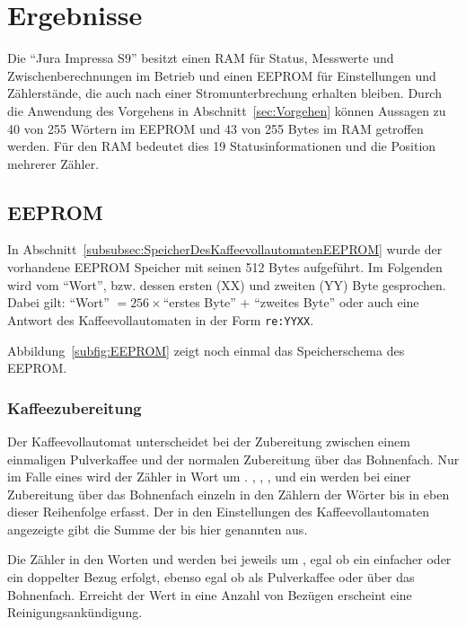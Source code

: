 \chapter{Ergebnisse}\label{ch:Ergebnisse} %
Die "`Jura Impressa S9"' besitzt einen \ac{RAM} für Status, Messwerte und Zwischenberechnungen im Betrieb und einen \ac{EEPROM} für Einstellungen und Zählerstände, die auch nach einer Stromunterbrechung erhalten bleiben.
Durch die Anwendung des Vorgehens in Abschnitt~\ref{sec:Vorgehen} können Aussagen zu 40 von 255 Wörtern im \ac{EEPROM} und 43 von 255 Bytes im \ac{RAM} getroffen werden.
Für den \ac{RAM} bedeutet dies 19 Statusinformationen und die Position mehrerer Zähler.

\section{EEPROM}
In Abschnitt~\ref{subsubsec:SpeicherDesKaffeevollautomatenEEPROM} wurde der vorhandene \acf{EEPROM} Speicher mit seinen 512 Bytes aufgeführt.
Im Folgenden wird vom "`Wort"', bzw. dessen ersten (XX) und zweiten (YY) Byte gesprochen.\\
Dabei gilt: "`Wort"' $= 256\times$"`erstes Byte"' $ + $ "`zweites Byte"' oder auch eine Antwort des Kaffeevollautomaten in der Form \texttt{re:YYXX}.

Abbildung~\ref{subfig:EEPROM} zeigt noch einmal das Speicherschema des \ac{EEPROM}.

\subsection{Kaffeezubereitung}\label{subsec:ErgebnisKaffeezubereitung}
Der Kaffeevollautomat unterscheidet bei der Zubereitung zwischen einem einmaligen Pulverkaffee und der normalen Zubereitung über das Bohnenfach.
Nur im Falle eines  wird der Zähler in Wort  um .
, , ,  und ein  werden bei einer Zubereitung über das Bohnenfach einzeln in den Zählern der Wörter  bis  in eben dieser Reihenfolge erfasst.
Der in den Einstellungen des Kaffeevollautomaten angezeigte  gibt die Summe der bis hier genannten  aus.

Die Zähler in den Worten  und  werden bei  jeweils um , egal ob ein einfacher oder ein doppelter Bezug erfolgt, ebenso egal ob als Pulverkaffee oder über das Bohnenfach.
Erreicht der Wert in  eine Anzahl von  Bezügen erscheint eine Reinigungsankündigung.

